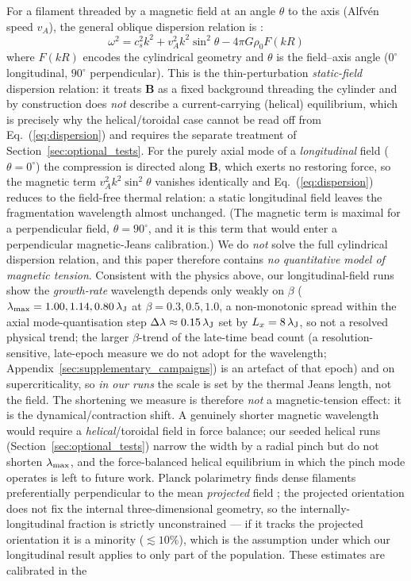\documentclass[usenatbib,twoside,twocolumn]{mnras}
\begin{document}
For a filament threaded by a magnetic field at an angle $\theta$ to the axis (Alfv\'en speed $v_A$), the general oblique dispersion relation is \citep{Nakamura1993}:
\begin{equation}
\omega^2 = c_s^2 k^2 + v_A^2 k^2 \sin^2\theta - 4\pi G\rho_0 F(kR)
\label{eq:dispersion}
\end{equation}
where $F(kR)$ encodes the cylindrical geometry and $\theta$ is the field--axis angle ($0^\circ$ longitudinal, $90^\circ$ perpendicular). This is the thin-perturbation \emph{static-field} dispersion relation: it treats $\mathbf{B}$ as a fixed background threading the cylinder and by construction does \emph{not} describe a current-carrying (helical) equilibrium, which is precisely why the helical/toroidal case cannot be read off from Eq.~(\ref{eq:dispersion}) and requires the separate treatment of Section~\ref{sec:optional_tests}. For the purely axial mode of a \emph{longitudinal} field ($\theta=0^\circ$) the compression is directed along $\mathbf{B}$, which exerts no restoring force, so the magnetic term $v_A^2k^2\sin^2\theta$ vanishes identically and Eq.~(\ref{eq:dispersion}) reduces to the field-free thermal relation: a static longitudinal field leaves the fragmentation wavelength almost unchanged. (The magnetic term is maximal for a perpendicular field, $\theta=90^\circ$, and it is this term that would enter a perpendicular magnetic-Jeans calibration.) We do \emph{not} solve the full cylindrical dispersion relation, and this paper therefore contains \emph{no quantitative model of magnetic tension}. Consistent with the physics above, our longitudinal-field runs show the \emph{growth-rate} wavelength depends only weakly on $\beta$ ($\lambda_{\rm max}=1.00,1.14,0.80\,\lambda_{\rm J}$ at $\beta=0.3,0.5,1.0$, a non-monotonic spread within the axial mode-quantisation step $\Delta\lambda\approx0.15\,\lambda_{\rm J}$ set by $L_x=8\,\lambda_{\rm J}$, so not a resolved physical trend; the larger $\beta$-trend of the late-time bead count (a resolution-sensitive, late-epoch measure we do not adopt for the wavelength; Appendix~\ref{sec:supplementary_campaigns}) is an artefact of that epoch) and on supercriticality, so \emph{in our runs} the scale is set by the thermal Jeans length, not the field. The shortening we measure is therefore \emph{not} a magnetic-tension effect: it is the dynamical/contraction shift. A genuinely shorter magnetic wavelength would require a \emph{helical}/toroidal field in force balance; our seeded helical runs (Section~\ref{sec:optional_tests}) narrow the width by a radial pinch but do not shorten $\lambda_{\rm max}$, and the force-balanced helical equilibrium in which the \citet{Fiege2000} pinch mode operates is left to future work. Planck polarimetry finds dense filaments preferentially perpendicular to the mean \emph{projected} field \citep{Jadhav2026}; the projected orientation does not fix the internal three-dimensional geometry, so the internally-longitudinal fraction is strictly unconstrained --- if it tracks the projected orientation it is a minority ($\lesssim10\%$), which is the assumption under which our longitudinal result applies to only part of the population. These estimates are calibrated in the 
\end{document}
